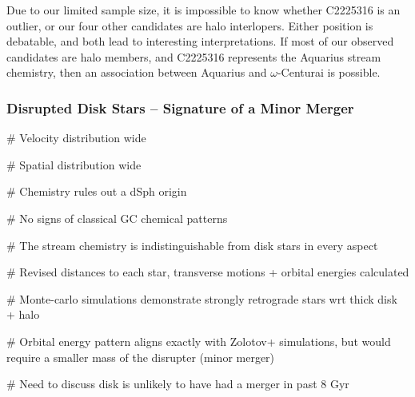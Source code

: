 \documentclass{emulateapj}
\begin{document}
Due to our limited sample size, it is impossible to know whether C2225316 is an outlier, or our four other candidates are halo interlopers. Either position is debatable, and both lead to interesting interpretations. If most of our observed candidates are halo members, and C2225316 represents the Aquarius stream chemistry, then an association between Aquarius and $\omega$-Centurai is possible. 


\subsubsection{Disrupted Disk Stars \--- Signature of a Minor Merger}

\# Velocity distribution wide

\# Spatial distribution wide

\# Chemistry rules out a dSph origin

\# No signs of classical GC chemical patterns

\# The stream chemistry is indistinguishable from disk stars in every aspect

\# Revised distances to each star, transverse motions + orbital energies calculated

\# Monte-carlo simulations demonstrate strongly retrograde stars wrt thick disk + halo

\# Orbital energy pattern aligns exactly with Zolotov+ simulations, but would require a smaller mass of the disrupter (minor merger)

\# Need to discuss disk is unlikely to have had a merger in past 8 Gyr

\end{document}
